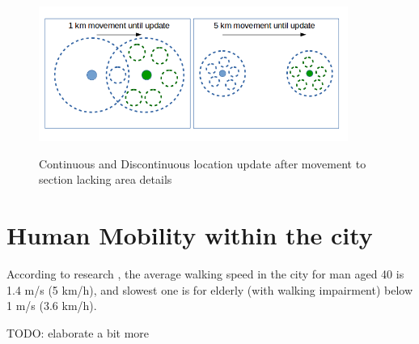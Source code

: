 \begin{figure}[!ht]
	\centering
	\includegraphics[width=0.9\textwidth]{images/movement_update.png}\\
	\caption{Continuous and Discontinuous location update after movement to section lacking area details  }
	\label{fig:movement_update}
\end{figure}
\FloatBarrier

\section{Human Mobility within the city}
\label{cha:introduction_hummob}

According to research \cite{HumanMobility1}\cite{HumanMobility2}\cite{HumanMobility3}, the average walking speed in the city for man aged 40 is 1.4 m/s (5 km/h), and slowest one is for elderly (with walking impairment) below 1 m/s (3.6 km/h). 

TODO: elaborate a bit more